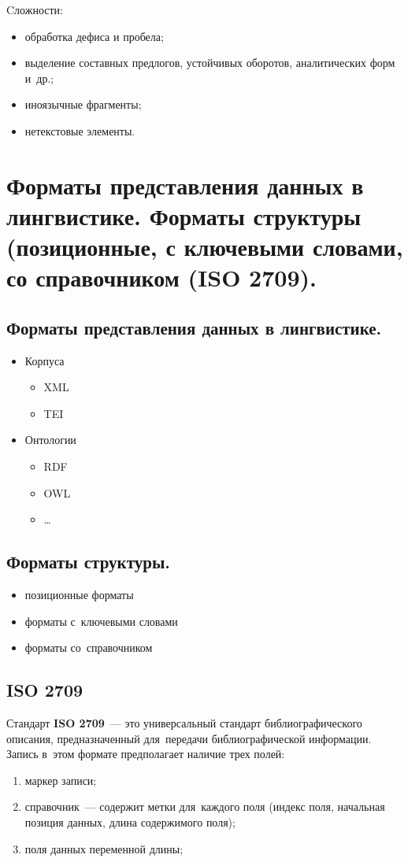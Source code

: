 \documentclass[12pt]{article}
\theoremstyle{definition}
\theoremstyle{remark}
\numberwithin{equation}{section}
\begin{document}
Cложности: 
\begin{itemize}
    \item обработка дефиса и пробела;
    \item выделение составных предлогов, устойчивых оборотов, аналитических форм и~др.;
    \item иноязычные фрагменты;
    \item нетекстовые элементы.
\end{itemize}

\section{Форматы представления данных в лингвистике. Форматы структуры (позиционные, с ключевыми словами, со справочником (ISO 2709).}
\subsection{Форматы представления данных в лингвистике.}
\begin{itemize}
    \item Корпуса
    \begin{itemize}
        \item XML
        \item TEI
    \end{itemize}
    \item Онтологии
    \begin{itemize}
        \item RDF
        \item OWL
        \item \dots
    \end{itemize}
\end{itemize}

\subsection{Форматы структуры.}
\begin{itemize}
    \item позиционные форматы
    \item форматы с~ключевыми словами
    \item форматы со~справочником
\end{itemize}

\subsection{ISO 2709}
\label{subsec:ISO}
Стандарт \textbf{ISO 2709}~--- это универсальный стандарт 
библиографического описания, предназначенный для~передачи 
библиографической информации. Запись в~этом формате предполагает 
наличие трех полей:
\begin{enumerate}
    \item маркер записи;
    \item справочник~--- содержит метки для~каждого поля 
    (индекс поля, начальная позиция данных, длина содержимого поля);
    \item поля данных переменной длины;
\end{enumerate}
\end{document}
